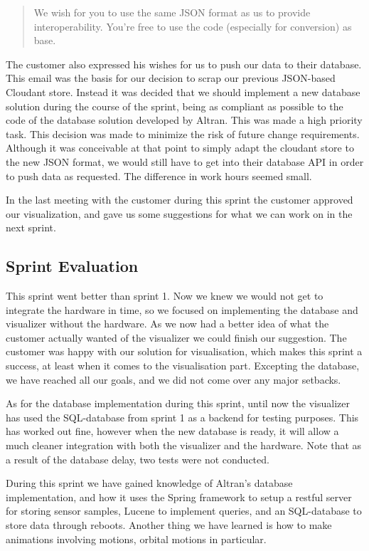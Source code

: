 \documentclass[../document]{subfiles}
\begin{document}
\begin{quote}
We wish for you to use the same JSON format as us to provide interoperability. You’re free to use the code (especially for conversion) as base.
\end{quote}

The customer also expressed his wishes for us to push our data to their database. This email was the basis for our decision to scrap our previous JSON-based Cloudant store. Instead it was decided that we should implement a new database solution during the course of the sprint, being as compliant as possible to the code of the database solution developed by Altran. This was made a high priority task. This decision was made to minimize the risk of future change requirements. Although it was conceivable at that point to simply adapt the cloudant store to the new JSON format, we would still have to get into their database API in order to push data as requested. The difference in work hours seemed small.

In the last meeting with the customer during this sprint the customer approved our visualization, and gave us some suggestions for what we can work on in the next sprint.  

\subsection{Sprint Evaluation}
This sprint went better than sprint 1. Now we knew we would not get to integrate the hardware in time, so we focused on implementing the database and visualizer without the hardware. As we now had a better idea of what the customer actually wanted of the visualizer we could finish our suggestion. The customer was happy with our solution for visualisation, which makes this sprint a success, at least when it comes to the visualisation part. Excepting the database, we have reached all our goals, and we did not come over any major setbacks.

As for the database implementation during this sprint, until now the visualizer has used the SQL-database from sprint 1 as a backend for testing purposes. This has worked out fine, however when the new database is ready, it will allow a much cleaner integration with both the visualizer and the hardware. Note that as a result of the database delay, two tests were not conducted.

During this sprint we have gained knowledge of Altran’s database implementation, and how it uses the Spring framework to setup a restful server for storing sensor samples, Lucene to implement queries, and an SQL-database to store data through reboots. Another thing we have learned is how to make animations involving motions, orbital motions in particular.
\end{document}
